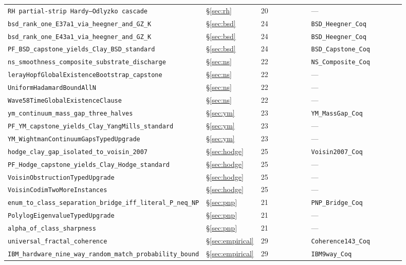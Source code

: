 \documentclass[11pt,a4paper]{article}
\theoremstyle{definition}
\theoremstyle{remark}
\newcommand{\lean}[1]{\texttt{\small #1}}
\begin{document}
\begin{longtable}{p{0.40\linewidth} p{0.13\linewidth} p{0.13\linewidth} p{0.24\linewidth}}
\lean{RH partial-strip Hardy--Odlyzko cascade} & \S\ref{sec:rh} & 20 & --- \\
\lean{bsd\_rank\_one\_E37a1\_via\_heegner\_and\_GZ\_K} & \S\ref{sec:bsd} & 24 & \lean{BSD\_Heegner\_Coq} \\
\lean{bsd\_rank\_one\_E43a1\_via\_heegner\_and\_GZ\_K} & \S\ref{sec:bsd} & 24 & \lean{BSD\_Heegner\_Coq} \\
\lean{PF\_BSD\_capstone\_yields\_Clay\_BSD\_standard} & \S\ref{sec:bsd} & 24 & \lean{BSD\_Capstone\_Coq} \\
\lean{ns\_smoothness\_composite\_substrate\_discharge} & \S\ref{sec:ns} & 22 & \lean{NS\_Composite\_Coq} \\
\lean{lerayHopfGlobalExistenceBootstrap\_capstone} & \S\ref{sec:ns} & 22 & --- \\
\lean{UniformHadamardBoundAllN} & \S\ref{sec:ns} & 22 & --- \\
\lean{Wave58TimeGlobalExistenceClause} & \S\ref{sec:ns} & 22 & --- \\
\lean{ym\_continuum\_mass\_gap\_three\_halves} & \S\ref{sec:ym} & 23 & \lean{YM\_MassGap\_Coq} \\
\lean{PF\_YM\_capstone\_yields\_Clay\_YangMills\_standard} & \S\ref{sec:ym} & 23 & --- \\
\lean{YM\_WightmanContinuumGapsTypedUpgrade} & \S\ref{sec:ym} & 23 & --- \\
\lean{hodge\_clay\_gap\_isolated\_to\_voisin\_2007} & \S\ref{sec:hodge} & 25 & \lean{Voisin2007\_Coq} \\
\lean{PF\_Hodge\_capstone\_yields\_Clay\_Hodge\_standard} & \S\ref{sec:hodge} & 25 & --- \\
\lean{VoisinObstructionTypedUpgrade} & \S\ref{sec:hodge} & 25 & --- \\
\lean{VoisinCodimTwoMoreInstances} & \S\ref{sec:hodge} & 25 & --- \\
\lean{enum\_to\_class\_separation\_bridge\_iff\_literal\_P\_neq\_NP} & \S\ref{sec:pnp} & 21 & \lean{PNP\_Bridge\_Coq} \\
\lean{PolylogEigenvalueTypedUpgrade} & \S\ref{sec:pnp} & 21 & --- \\
\lean{alpha\_of\_class\_sharpness} & \S\ref{sec:pnp} & 21 & --- \\
\lean{universal\_fractal\_coherence} & \S\ref{sec:empirical} & 29 & \lean{Coherence143\_Coq} \\
\lean{IBM\_hardware\_nine\_way\_random\_match\_probability\_bound} & \S\ref{sec:empirical} & 29 & \lean{IBM9way\_Coq} \\

\end{longtable}
\end{document}
